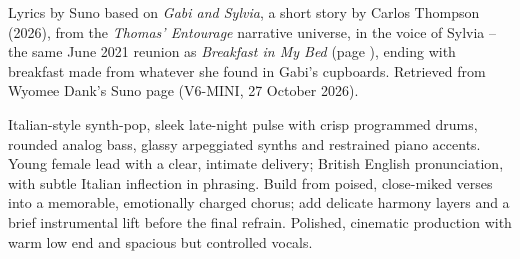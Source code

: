 
\label{sec:breakfast-on-a-tray}
\begin{notes}
Lyrics by Suno based on \emph{Gabi and Sylvia}, a short story by Carlos Thompson (2026), from the \emph{Thomas' Entourage} narrative universe, in the voice of Sylvia -- the same June 2021 reunion as \emph{Breakfast in My Bed} (page \pageref{sec:breakfast-in-my-bed}), ending with breakfast made from whatever she found in Gabi's cupboards. Retrieved from Wyomee Dank's Suno page (V6-MINI, 27 October 2026).
\end{notes}
\begin{style}
Italian-style synth-pop, sleek late-night pulse with crisp programmed drums, rounded analog bass, glassy arpeggiated synths and restrained piano accents. Young female lead with a clear, intimate delivery; British English pronunciation, with subtle Italian inflection in phrasing. Build from poised, close-miked verses into a memorable, emotionally charged chorus; add delicate harmony layers and a brief instrumental lift before the final refrain. Polished, cinematic production with warm low end and spacious but controlled vocals.
\end{style}
